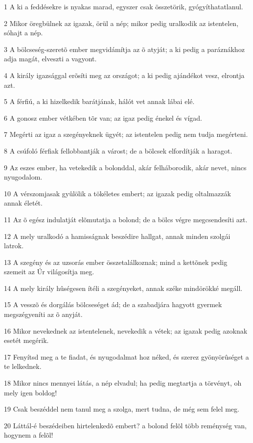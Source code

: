 \par 1 A ki a feddésekre is nyakas marad, egyszer csak összetörik, gyógyíthatatlanul.
\par 2 Mikor öregbülnek az igazak, örül a nép; mikor pedig uralkodik az istentelen, sóhajt a nép.
\par 3 A bölcseség-szeretõ ember megvidámítja az õ atyját; a ki pedig a paráznákhoz adja magát, elveszti  a vagyont.
\par 4 A király igazsággal erõsíti meg az országot; a ki pedig ajándékot vesz, elrontja azt.
\par 5 A férfiú, a ki hizelkedik barátjának, hálót vet annak lábai elé.
\par 6 A gonosz ember vétkében tõr van; az igaz pedig énekel és vígad.
\par 7 Megérti az igaz a szegényeknek ügyét; az istentelen  pedig nem tudja megérteni.
\par 8 A csúfoló férfiak fellobbantják a várost; de a bölcsek elfordítják a haragot.
\par 9 Az eszes ember, ha vetekedik a bolonddal, akár felháborodik, akár nevet, nincs nyugodalom.
\par 10 A vérszomjasak gyûlölik a tökéletes embert; az igazak pedig oltalmazzák annak életét.
\par 11 Az õ egész indulatját elõmutatja a bolond; de a bölcs végre megcsendesíti azt.
\par 12 A mely uralkodó a hamisságnak beszédire hallgat, annak minden szolgái latrok.
\par 13 A szegény és az uzsorás ember összetalálkoznak; mind a kettõnek pedig szemeit az Úr világosítja meg.
\par 14 A mely király hûségesen ítéli a szegényeket, annak széke mindörökké megáll.
\par 15 A vesszõ és dorgálás bölcseséget ád; de a szabadjára hagyott gyermek megszégyeníti az õ anyját.
\par 16 Mikor nevekednek az istentelenek, nevekedik a vétek; az igazak pedig azoknak esetét megérik.
\par 17 Fenyítsd meg a te fiadat, és nyugodalmat hoz néked, és szerez gyönyörûséget a te lelkednek.
\par 18 Mikor nincs mennyei látás, a nép elvadul; ha pedig megtartja a törvényt, oh mely igen boldog!
\par 19 Csak beszéddel nem tanul meg a szolga, mert tudna, de még sem felel meg.
\par 20 Láttál-é beszédeiben hirtelenkedõ embert? a bolond felõl több reménység van, hogynem a felõl!
